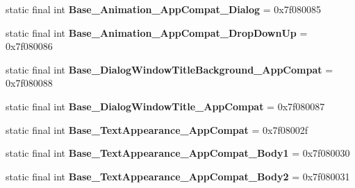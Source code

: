 \begin{DoxyCompactItemize}
\item 
\hypertarget{classandroid_1_1support_1_1design_1_1_r_1_1style_a92600d437c660a5b33479eca5df7375c}{}static final int {\bfseries Base\+\_\+\+Animation\+\_\+\+App\+Compat\+\_\+\+Dialog} = 0x7f080085\label{classandroid_1_1support_1_1design_1_1_r_1_1style_a92600d437c660a5b33479eca5df7375c}

\item 
\hypertarget{classandroid_1_1support_1_1design_1_1_r_1_1style_a5f411ec5e655a9763c28ecfd298e9e8a}{}static final int {\bfseries Base\+\_\+\+Animation\+\_\+\+App\+Compat\+\_\+\+Drop\+Down\+Up} = 0x7f080086\label{classandroid_1_1support_1_1design_1_1_r_1_1style_a5f411ec5e655a9763c28ecfd298e9e8a}

\item 
\hypertarget{classandroid_1_1support_1_1design_1_1_r_1_1style_a206a09a3d56b243175ac0425e4861ce9}{}static final int {\bfseries Base\+\_\+\+Dialog\+Window\+Title\+Background\+\_\+\+App\+Compat} = 0x7f080088\label{classandroid_1_1support_1_1design_1_1_r_1_1style_a206a09a3d56b243175ac0425e4861ce9}

\item 
\hypertarget{classandroid_1_1support_1_1design_1_1_r_1_1style_a476f4387fec10156084906d154b6eba6}{}static final int {\bfseries Base\+\_\+\+Dialog\+Window\+Title\+\_\+\+App\+Compat} = 0x7f080087\label{classandroid_1_1support_1_1design_1_1_r_1_1style_a476f4387fec10156084906d154b6eba6}

\item 
\hypertarget{classandroid_1_1support_1_1design_1_1_r_1_1style_ab59a4ce42c1b2e787d54c04c8482593d}{}static final int {\bfseries Base\+\_\+\+Text\+Appearance\+\_\+\+App\+Compat} = 0x7f08002f\label{classandroid_1_1support_1_1design_1_1_r_1_1style_ab59a4ce42c1b2e787d54c04c8482593d}

\item 
\hypertarget{classandroid_1_1support_1_1design_1_1_r_1_1style_a1c720a456a5085382ac584cac0b0bab4}{}static final int {\bfseries Base\+\_\+\+Text\+Appearance\+\_\+\+App\+Compat\+\_\+\+Body1} = 0x7f080030\label{classandroid_1_1support_1_1design_1_1_r_1_1style_a1c720a456a5085382ac584cac0b0bab4}

\item 
\hypertarget{classandroid_1_1support_1_1design_1_1_r_1_1style_a5d5e30cfe76ac49b6714e25e393b07a5}{}static final int {\bfseries Base\+\_\+\+Text\+Appearance\+\_\+\+App\+Compat\+\_\+\+Body2} = 0x7f080031\label{classandroid_1_1support_1_1design_1_1_r_1_1style_a5d5e30cfe76ac49b6714e25e393b07a5}


\end{DoxyCompactItemize}
